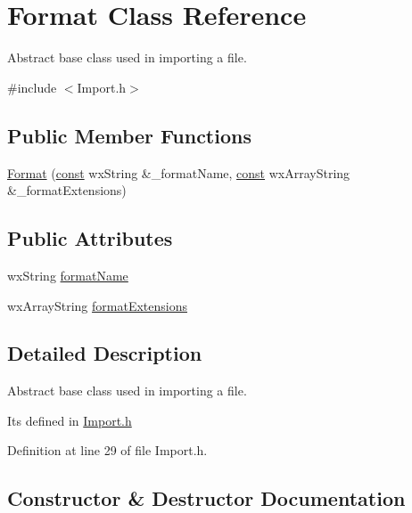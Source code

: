 \hypertarget{class_format}{}\section{Format Class Reference}
\label{class_format}


Abstract base class used in importing a file.  




{\ttfamily \#include $<$Import.\+h$>$}

\subsection*{Public Member Functions}
\begin{DoxyCompactItemize}
\item 
\hyperlink{class_format_af2ec87474aea1ed13f2f582dd6343361}{Format} (\hyperlink{getopt1_8c_a2c212835823e3c54a8ab6d95c652660e}{const} wx\+String \&\+\_\+format\+Name, \hyperlink{getopt1_8c_a2c212835823e3c54a8ab6d95c652660e}{const} wx\+Array\+String \&\+\_\+format\+Extensions)
\end{DoxyCompactItemize}
\subsection*{Public Attributes}
\begin{DoxyCompactItemize}
\item 
wx\+String \hyperlink{class_format_aae1cd6db88df2126f153365b30c2196e}{format\+Name}
\item 
wx\+Array\+String \hyperlink{class_format_a9001e0d4c9ff3cd9247089209c75d804}{format\+Extensions}
\end{DoxyCompactItemize}


\subsection{Detailed Description}
Abstract base class used in importing a file. 

It\textquotesingle{}s defined in \hyperlink{_import_8h}{Import.\+h} 

Definition at line 29 of file Import.\+h.



\subsection{Constructor \& Destructor Documentation}
